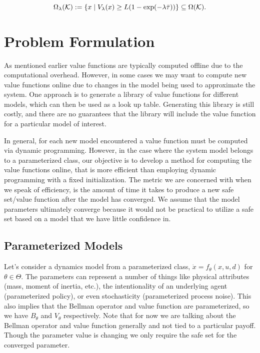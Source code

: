 \documentclass[letterpaper, 10 pt, conference]{ieeeconf}
\begin{document}
\begin{equation} \label{eq:safe_set_lambda}
\Omega_{\lambda}(\mathcal{K}) := \{x \mid V_{\lambda}(x) \ge L( 1 -  \exp(-\lambda \bar{\tau})) \} \subseteq \Omega(\mathcal{K}).
\end{equation}  

\section{Problem Formulation}
As mentioned earlier value functions are typically computed offline due to the computational overhead. However, in some cases we may want to compute new value functions online due to changes in the model being used to approximate the system. One approach is to generate a library of value functions for different models, which can then be used as a look up table. Generating this library is still costly, and there are no guarantees that the library will include the value function for a particular model of interest.

In general, for each new model encountered  a value function must be computed via dynamic programming. However, in the case where the system model belongs to a parameterized class, our objective is to develop a method for computing the value functions online, that is more efficient than employing dynamic programming with a fixed initialization. The metric we are concerned with when we speak of efficiency, is the amount of time it takes to produce a new safe set/value function after the model has converged. We assume that the model parameters ultimately converge because it would not be practical to utilize a safe set based on a model that we have little confidence in.

\subsection{Parameterized Models}
Let's consider a dynamics model from a  parameterized class, $\dot{x}=f_{\theta}(x,u,d)$ for $\theta \in \Theta$. The parameters can represent a number of things like physical attributes (mass, moment of inertia, etc.), the intentionality of an underlying agent (parameterized policy), or even stochasticity (parameterized process noise). This also implies that the Bellman operator and value function are parameterized, so we have $B_\theta$ and $V_\theta$ respectively. Note that for now we are talking about the Bellman operator and value function generally and not tied to a particular payoff. Though the parameter value is changing we only require the safe set for the converged parameter.
\end{document}
